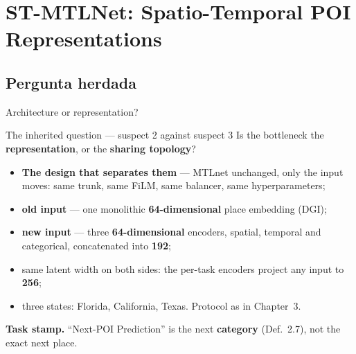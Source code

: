 \documentclass{beamer}
\begin{document}
\section[ST-MTLNet]{ST-MTLNet: Spatio-Temporal POI Representations}


\subsection{Pergunta herdada}

\begin{frame}{Architecture or representation?}
    \begin{alertblock}{The inherited question --- suspect 2 against suspect 3}
        \centering Is the bottleneck the \textbf{representation}, or the \textbf{sharing topology}?
    \end{alertblock}

    \medskip
    \begin{itemize}\setlength{\itemsep}{4pt}
        \item \textbf{The design that separates them} --- MTLnet unchanged, \alert{only the input
              moves}: same trunk, same FiLM, same balancer, same hyperparameters;
        \item \textbf{old input} --- one monolithic \textbf{64-dimensional} place embedding (DGI);
        \item \textbf{new input} --- three \textbf{64-dimensional} encoders, spatial, temporal and
              categorical, concatenated into \textbf{192};
        \item same latent width on both sides: the per-task encoders project any input to
              \textbf{256};
        \item three states: Florida, California, Texas. Protocol as in Chapter~3.
    \end{itemize}

    \vfill
    {\scriptsize\color{secondary}\textbf{Task stamp.} ``Next-POI Prediction'' is the next
    \textbf{category} (Def.~2.7), not the exact next place.\par}
\end{frame}
\end{document}
